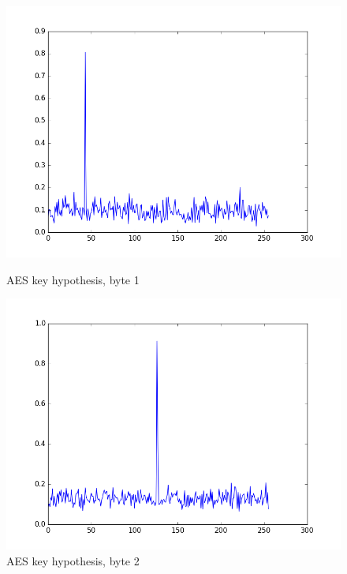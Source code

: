 \documentclass{article}
\begin{document}
\begin{figure}[ht]
  \centering
  \begin{minipage}[b]{0.45\linewidth}
    \includegraphics[scale=0.35]{figure_1_1.png}
    \caption{AES key hypothesis, byte 1}
    \label{fig:key_1}
  \end{minipage}
  \quad
  \begin{minipage}[b]{0.45\linewidth}
    \includegraphics[scale=0.35]{figure_1_2.png}
    \caption{AES key hypothesis, byte 2}
    \label{fig:key_2}
  \end{minipage}
\end{figure}



\end{document}
